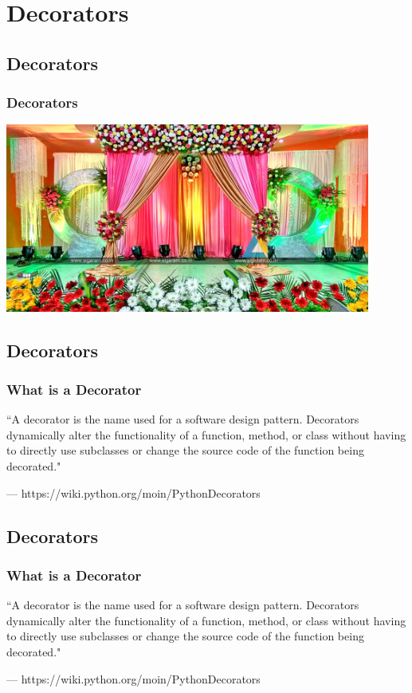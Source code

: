 \section{Decorators}


\subsection{Decorators}
\begin{frame}
\frametitle{Decorators}
	\includegraphics[width=0.9\textwidth]{img/decorators.jpg}
\end{frame}

\subsection{Decorators}
\begin{frame}
\frametitle{What is a Decorator}
\setlength{\epigraphwidth}{0.9\textwidth}
\epigraph{``A decorator is the name used for a software design pattern.
Decorators dynamically alter the functionality of a function, method, or class without having to directly use subclasses or change the source code of the function being decorated."}{--- https://wiki.python.org/moin/PythonDecorators}

\end{frame}

\subsection{Decorators}
\begin{frame}
\frametitle{What is a Decorator}
\setlength{\epigraphwidth}{0.9\textwidth}
\epigraph{``A decorator is the name used for a software design pattern.
Decorators dynamically alter the functionality of a function, method, or class without having to directly use subclasses or change the source code of the function being decorated."}{--- https://wiki.python.org/moin/PythonDecorators}

\end{frame}


